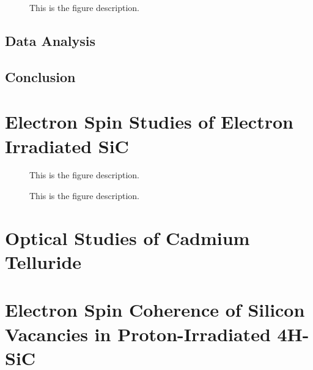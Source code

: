 \documentclass[oneside, astronomy, noacknowlegments]{BYUPhys}
\begin{document}
\begin{figure}
    \caption[Experimental ODMR for CdTe]{\label{fig:CdTeResults}
     This is the figure description.}
 \end{figure}


\section{Data Analysis}

\section{Conclusion}

\begin{appendices}











\chapter{Electron Spin Studies of Electron Irradiated SiC}
\label{chpt:AppendA}

\begin{figure}
    \caption[Electron-irradiated SiC lifetime  summary]{\label{fig:e17results}
     This is the figure description.}
 \end{figure}

\begin{figure}
    \caption[ODMR/Photoluminescence vs temperature]{\label{fig:ODMRPL}
     This is the figure description.}
 \end{figure}











\chapter{Optical Studies of Cadmium Telluride}
\label{chpt:AppendB}









\chapter{Electron Spin Coherence of Silicon Vacancies in Proton-Irradiated 4H-SiC}
\label{chpt:AppendC}

\end{appendices}
\end{document}
